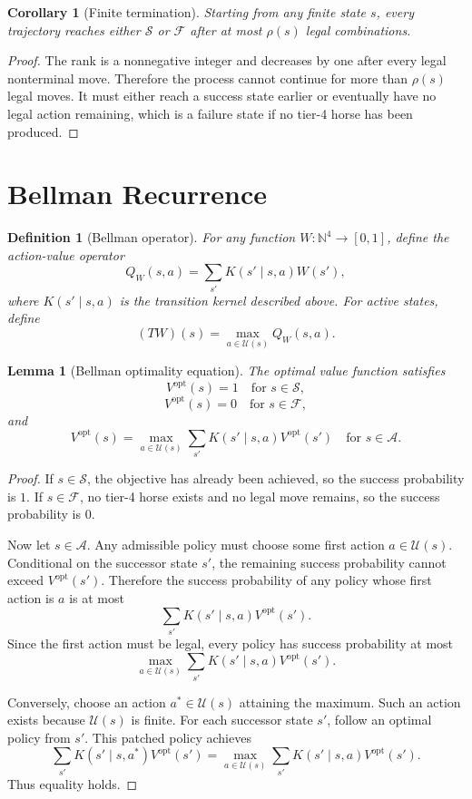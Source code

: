 \documentclass[11pt]{article}
\newtheorem{lemma}[theorem]{Lemma}
\newtheorem{corollary}[theorem]{Corollary}
\newtheorem{definition}[theorem]{Definition}
\newcommand{\N}{\mathbb{N}}
\newcommand{\Success}{\mathcal{S}}
\newcommand{\Failure}{\mathcal{F}}
\newcommand{\Active}{\mathcal{A}}
\newcommand{\Actions}{\mathcal{U}}
\newcommand{\rank}{\rho}
\newcommand{\opt}{\mathrm{opt}}
\begin{document}
\begin{corollary}[Finite termination]
Starting from any finite state \(s\), every trajectory reaches either \(\Success\) or \(\Failure\) after at most \(\rank(s)\) legal combinations.
\end{corollary}

\begin{proof}
The rank is a nonnegative integer and decreases by one after every legal nonterminal move.  Therefore the process cannot continue for more than \(\rank(s)\) legal moves.  It must either reach a success state earlier or eventually have no legal action remaining, which is a failure state if no tier-4 horse has been produced.
\end{proof}

\section{Bellman Recurrence}

\begin{definition}[Bellman operator]
For any function \(W:\N^4\to[0,1]\), define the action-value operator
\[
    Q_W(s,a)=\sum_{s'}K(s'\mid s,a)W(s'),
\]
where \(K(s'\mid s,a)\) is the transition kernel described above.  For active states, define
\[
    (TW)(s)=\max_{a\in\Actions(s)}Q_W(s,a).
\]
\end{definition}

\begin{lemma}[Bellman optimality equation]
The optimal value function satisfies
\[
    V^\opt(s)=1 \quad\text{for }s\in\Success,
\]
\[
    V^\opt(s)=0 \quad\text{for }s\in\Failure,
\]
and
\[
    V^\opt(s)
    =
    \max_{a\in\Actions(s)}
    \sum_{s'}K(s'\mid s,a)V^\opt(s')
    \quad\text{for }s\in\Active.
\]
\end{lemma}

\begin{proof}
If \(s\in\Success\), the objective has already been achieved, so the success probability is \(1\).  If \(s\in\Failure\), no tier-4 horse exists and no legal move remains, so the success probability is \(0\).

Now let \(s\in\Active\).  Any admissible policy must choose some first action \(a\in\Actions(s)\).  Conditional on the successor state \(s'\), the remaining success probability cannot exceed \(V^\opt(s')\).  Therefore the success probability of any policy whose first action is \(a\) is at most
\[
    \sum_{s'}K(s'\mid s,a)V^\opt(s').
\]
Since the first action must be legal, every policy has success probability at most
\[
    \max_{a\in\Actions(s)}
    \sum_{s'}K(s'\mid s,a)V^\opt(s').
\]

Conversely, choose an action \(a^*\in\Actions(s)\) attaining the maximum.  Such an action exists because \(\Actions(s)\) is finite.  For each successor state \(s'\), follow an optimal policy from \(s'\).  This patched policy achieves
\[
    \sum_{s'}K(s'\mid s,a^*)V^\opt(s')
    =
    \max_{a\in\Actions(s)}
    \sum_{s'}K(s'\mid s,a)V^\opt(s').
\]
Thus equality holds.
\end{proof}
\end{document}
